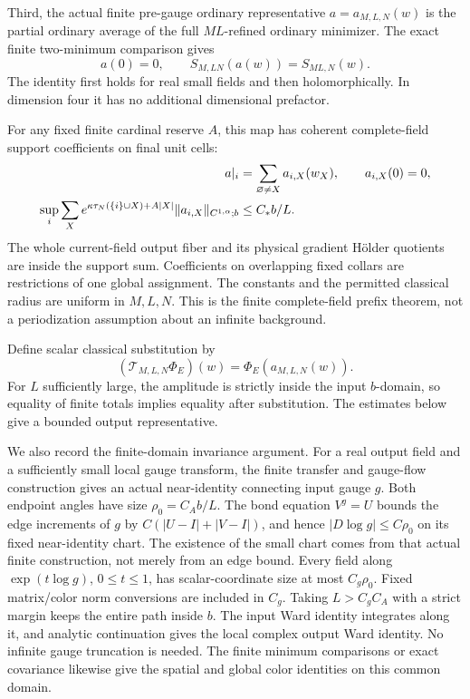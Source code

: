 Third, the actual finite pre-gauge ordinary representative
\(a=a_{M,L,N}(w)\) is the partial ordinary average of the
full \(ML\)-refined ordinary minimizer. The exact finite
two-minimum comparison gives
\begin{equation}
 a(0)=0,\qquad
 S_{M,LN}(a(w))=S_{ML,N}(w).
 \label{fcc-reference-transport}
\end{equation}
The identity first holds for real small fields and then
holomorphically. In dimension four it has no additional
dimensional prefactor.

For any fixed finite cardinal reserve \(A\), this map has
coherent complete-field support coefficients on final unit
cells:
\begin{align}
 a|_i&=\sum_{\varnothing\ne X}a_{i,X}(w_X),
       \qquad a_{i,X}(0)=0,\notag\\
 \sup_i\sum_X e^{\kappa\tau_N(\{i\}\cup X)+A|X|}
       \|a_{i,X}\|_{C^{1,\alpha};b}
      &\le C_* b/L.
 \label{fcc-pregauge-family}
\end{align}
The whole current-field output fiber and its physical
gradient H\"older quotients are inside the support sum.
Coefficients on overlapping fixed collars are restrictions
of one global assignment. The constants and the permitted
classical radius are uniform in \(M,L,N\). This is the
finite complete-field prefix theorem, not a periodization
assumption about an infinite background.

Define scalar classical substitution by
\begin{equation}
 (\mathcal T_{M,L,N}\Phi_E)(w)=\Phi_E(a_{M,L,N}(w)).
 \label{fcc-transport}
\end{equation}
For \(L\) sufficiently large, the amplitude is strictly
inside the input \(b\)-domain, so equality of finite totals
implies equality after substitution. The estimates below
give a bounded output representative.

We also record the finite-domain invariance argument.
For a real output field and a sufficiently small local
gauge transform, the finite transfer and gauge-flow
construction gives an actual near-identity connecting
input gauge \(g\). Both endpoint angles have size
\(\rho_0=C_A b/L\). The bond equation \(V^g=U\) bounds
the edge increments of \(g\) by
\(C(|U-I|+|V-I|)\), and hence
\(|D\log g|\le C\rho_0\) on its fixed near-identity chart.
The existence of the small chart comes from that actual
finite construction, not merely from an edge bound.
Every field along \(\exp(t\log g)\), \(0\le t\le1\), has
scalar-coordinate size at most \(C_g\rho_0\). Fixed
matrix/color norm conversions are included in \(C_g\).
Taking \(L>C_gC_A\) with a strict margin keeps the entire
path inside \(b\). The input Ward identity integrates
along it, and analytic continuation gives the local
complex output Ward identity. No infinite gauge
truncation is needed. The finite minimum comparisons
or exact covariance likewise give the spatial and
global color identities on this common domain.

